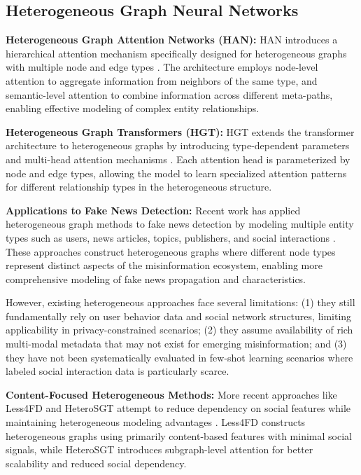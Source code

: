 \subsection{Heterogeneous Graph Neural Networks}

\textbf{Heterogeneous Graph Attention Networks (HAN):} HAN introduces a hierarchical attention mechanism specifically designed for heterogeneous graphs with multiple node and edge types \cite{wang2019heterogeneous}. The architecture employs node-level attention to aggregate information from neighbors of the same type, and semantic-level attention to combine information across different meta-paths, enabling effective modeling of complex entity relationships.


\textbf{Heterogeneous Graph Transformers (HGT):} HGT extends the transformer architecture to heterogeneous graphs by introducing type-dependent parameters and multi-head attention mechanisms \cite{hu2020heterogeneous}. Each attention head is parameterized by node and edge types, allowing the model to learn specialized attention patterns for different relationship types in the heterogeneous structure.

\textbf{Applications to Fake News Detection:} Recent work has applied heterogeneous graph methods to fake news detection by modeling multiple entity types such as users, news articles, topics, publishers, and social interactions \cite{dou2021user, lu2020gcan, silva2021embracing}. These approaches construct heterogeneous graphs where different node types represent distinct aspects of the misinformation ecosystem, enabling more comprehensive modeling of fake news propagation and characteristics.


However, existing heterogeneous approaches face several limitations: (1) they still fundamentally rely on user behavior data and social network structures, limiting applicability in privacy-constrained scenarios; (2) they assume availability of rich multi-modal metadata that may not exist for emerging misinformation; and (3) they have not been systematically evaluated in few-shot learning scenarios where labeled social interaction data is particularly scarce.

\textbf{Content-Focused Heterogeneous Methods:} More recent approaches like Less4FD and HeteroSGT attempt to reduce dependency on social features while maintaining heterogeneous modeling advantages \cite{zhang2023less4fd, wang2023heterosgt}. Less4FD constructs heterogeneous graphs using primarily content-based features with minimal social signals, while HeteroSGT introduces subgraph-level attention for better scalability and reduced social dependency.

